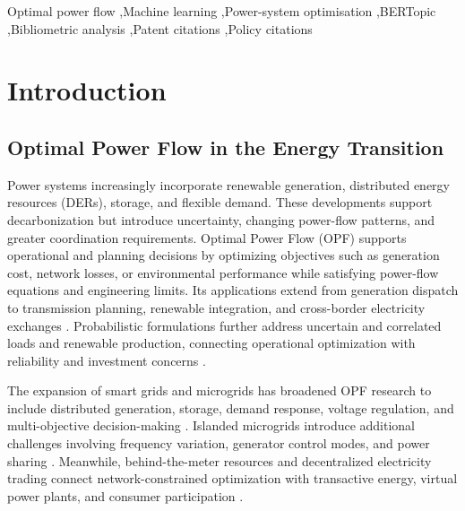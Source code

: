 \documentclass[a4paper,fleqn]{cas-sc}
\begin{document}
    
    
    \begin{keywords}
    Optimal power flow \sep Machine learning \sep Power-system optimisation \sep BERTopic \sep Bibliometric analysis \sep Patent citations \sep Policy citations
    \end{keywords}
    
    \maketitle
    \section{Introduction}
    \label{sec:introduction}
    
    \subsection{Optimal Power Flow in the Energy Transition}
    
    Power systems increasingly incorporate renewable generation, distributed energy resources (DERs), storage, and flexible demand. These developments support decarbonization but introduce uncertainty, changing power-flow patterns, and greater coordination requirements. Optimal Power Flow (OPF) supports operational and planning decisions by optimizing objectives such as generation cost, network losses, or environmental performance while satisfying power-flow equations and engineering limits. Its applications extend from generation dispatch to transmission planning, renewable integration, and cross-border electricity exchanges \cite{singh2014optimal}. Probabilistic formulations further address uncertain and correlated loads and renewable production, connecting operational optimization with reliability and investment concerns \cite{aien2015probabilistic}.
    
    The expansion of smart grids and microgrids has broadened OPF research to include distributed generation, storage, demand response, voltage regulation, and multi-objective decision-making \cite{abdi2017review}. Islanded microgrids introduce additional challenges involving frequency variation, generator control modes, and power sharing \cite{moradi2017power}. Meanwhile, behind-the-meter resources and decentralized electricity trading connect network-constrained optimization with transactive energy, virtual power plants, and consumer participation \cite{guerrero2020towards}.
    
\end{document}

